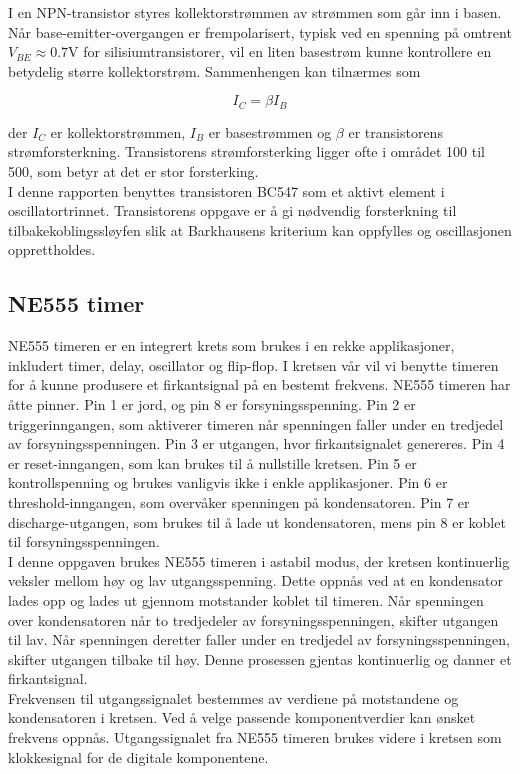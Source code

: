 \noindent
I en NPN-transistor styres kollektorstrømmen av strømmen som går inn i basen. Når base-emitter-overgangen er frempolarisert, typisk ved en spenning på omtrent $V_{BE}\approx0.7$V for silisiumtransistorer, vil en liten basestrøm kunne kontrollere en betydelig større kollektorstrøm. Sammenhengen kan tilnærmes som

\[
I_C = \beta I_B
\]

\noindent
der $I_C$ er kollektorstrømmen, $I_B$ er basestrømmen og $\beta$ er transistorens strømforsterkning. Transistorens strømforsterking ligger ofte i området 100 til 500, som betyr at det er stor forsterking. \\[1em]
I denne rapporten benyttes transistoren BC547 som et aktivt element i oscillatortrinnet. Transistorens oppgave er å gi nødvendig forsterkning til tilbakekoblingssløyfen slik at Barkhausens kriterium kan oppfylles og oscillasjonen opprettholdes.



\subsection{NE555 timer}

NE555 timeren er en integrert krets som brukes i en rekke applikasjoner, inkludert timer, delay, oscillator og flip-flop. I kretsen vår vil vi benytte timeren for å kunne produsere et firkantsignal på en bestemt frekvens. NE555 timeren har åtte pinner. Pin 1 er jord, og pin 8 er forsyningsspenning. Pin 2 er triggerinngangen, som aktiverer timeren når spenningen faller under en tredjedel av forsyningsspenningen. Pin 3 er utgangen, hvor firkantsignalet genereres. Pin 4 er reset-inngangen, som kan brukes til å nullstille kretsen. Pin 5 er kontrollspenning og brukes vanligvis ikke i enkle applikasjoner. Pin 6 er threshold-inngangen, som overvåker spenningen på kondensatoren. Pin 7 er discharge-utgangen, som brukes til å lade ut kondensatoren, mens pin 8 er koblet til forsyningsspenningen.
\\[1em]
I denne oppgaven brukes NE555 timeren i astabil modus, der kretsen kontinuerlig veksler mellom høy og lav utgangsspenning. Dette oppnås ved at en kondensator lades opp og lades ut gjennom motstander koblet til timeren. Når spenningen over kondensatoren når to tredjedeler av forsyningsspenningen, skifter utgangen til lav. Når spenningen deretter faller under en tredjedel av forsyningsspenningen, skifter utgangen tilbake til høy. Denne prosessen gjentas kontinuerlig og danner et firkantsignal.
\\[1em]
Frekvensen til utgangssignalet bestemmes av verdiene på motstandene og kondensatoren i kretsen. Ved å velge passende komponentverdier kan ønsket frekvens oppnås. Utgangssignalet fra NE555 timeren brukes videre i kretsen som klokkesignal for de digitale komponentene.



